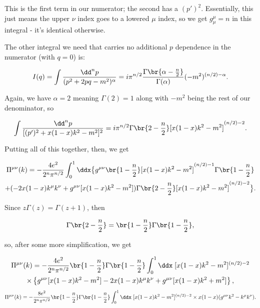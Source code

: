 \documentclass[titlepage]{article}
\begin{document}
This is the first term in our numerator; the second has a $(p')^2$. Essentially, this just means the upper $\nu$ index goes to a lowered $\mu$ index, so we get $g^{\mu}_{\mu} = n$ in this integral - it's identical otherwise.

The other integral we need that carries no additional $p$ dependence in the numerator (with $q=0$) is:

\begin{equation}
    I(q) = \int \frac{\dd^np}{(p^2 + 2pq - m^2)^{\alpha}} = i\pi^{n/2} \frac{\Gamma\br{\alpha - \frac{n}{2}}}{\Gamma(\alpha)} (-m^2)^{(n/2) - \alpha}.
\end{equation}

Again, we have $\alpha=2$ meaning $\Gamma(2) = 1$ along with $-m^2$ being the rest of our denominator, so

\begin{equation}
    \int \frac{\dd^np}{[(p')^2 + x(1-x)k^2 -m^2]^2} = i\pi^{n/2}\Gamma\br{2 - \frac{n}{2}}[x(1-x)k^2 - m^2]^{(n/2)-2}.
\end{equation}

Putting all of this together, then, we get

\begin{multline}
    \Pi^{\mu\nu}(k) = -\frac{4e^2}{2^n \pi^{n/2}} \int_0^1 \ddx \big\{ g^{\mu\nu}\br{1 - \frac{n}{2}} [x(1-x)k^2 - m^2]^{(n/2)-1} \Gamma\br{1 - \frac{n}{2}} \\ + (-2x(1-x)k^{\mu}k^{\nu} + g^{\mu\nu}[x(1-x)k^2 - m^2]) \Gamma\br{2 - \frac{n}{2}}[x(1-x)k^2 - m^2]^{(n/2)-2} \big\}.
\end{multline}

Since $z\Gamma(z) = \Gamma(z+1)$, then

\begin{equation}
    \Gamma\br{2 - \frac{n}{2}} = \br{1 - \frac{n}{2}}\Gamma\br{1 - \frac{n}{2}},
\end{equation}

so, after some more simplification, we get

\begin{multline}
    \Pi^{\mu\nu}(k) = -\frac{4e^2}{2^n \pi^{n/2}} \br{1 - \frac{n}{2}}\Gamma\br{1 - \frac{n}{2}} \int_0^1 \ddx \; [x(1-x)k^2 - m^2]^{(n/2) - 2} \\ \times \left\{  g^{\mu\nu}[x(1-x)k^2 - m^2] - 2x(1-x)k^{\mu}k^{\nu} + g^{\mu\nu}[x(1-x)k^2 + m^2]  \right\},
\end{multline}
\begin{equation}
    \Pi^{\mu\nu}(k) = -\frac{8e^2}{2^n \pi^{n/2}} \br{1 - \frac{n}{2}}\Gamma\br{1 - \frac{n}{2}} \int_0^1 \ddx \; [x(1-x)k^2 - m^2]^{(n/2) - 2} \times x(1-x) (  g^{\mu\nu}k^2 - k^{\mu}k^{\nu} ).
\end{equation}
\end{document}
